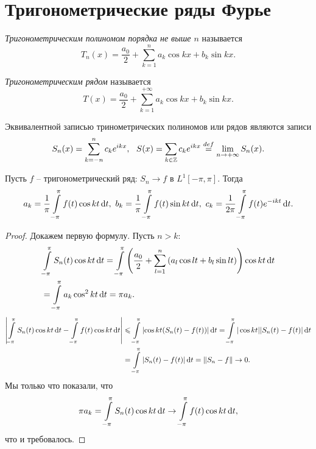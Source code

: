 \section{Тригонометрические ряды Фурье}

\begin{definition}
    \textit{Тригонометрическим полиномом порядка не выше $n$} называется
    \[
        T_n(x) = \frac{a_0}{2} + \sum_{k = 1}^n{a_k \cos{kx} + b_k \sin{kx}}
    .\]
\end{definition}

\begin{definition}
    \textit{Тригонометрическим рядом} называется
    \[
        T(x) = \frac{a_0}{2} + \sum_{k = 1}^{+\infty}{a_k \cos{kx} + b_k \sin{kx}}
    .\]
\end{definition}

\begin{remark}
    Эквивалентной записью тринометрических полиномов или рядов являются записи
    \[
        S_n(x) = \sum_{k = -n}^n{c_k e^{ikx}},~~ S(x) = \sum_{k \in \bZ}{c_k e^{ikx}}
        \defeq \lim_{n \to +\infty}{S_n(x)}
    .\]
\end{remark}

\begin{lemma}
    Пусть $f$ -- тригонометрический ряд: $S_n \to f$ в $L^1[-\pi, \pi]$. Тогда
    \[
        a_k = \frac{1}{\pi}\intl_{-\pi}^\pi{f(t) \cos{kt} \dd t},~
        b_k = \frac{1}{\pi}\intl_{-\pi}^\pi{f(t) \sin{kt} \dd t},~
        c_k = \frac{1}{2\pi}\intl_{-\pi}^\pi{f(t) e^{-ikt} \dd t}
    .\]
\end{lemma}
\begin{proof}
    Докажем первую формулу. Пусть $n > k$:
    \begin{align*}
        &\intl_{-\pi}^\pi{S_n(t) \cos{kt} \dd t} = \intl_{-\pi}^\pi{
            \parens*{\frac{a_0}{2} + \sum_{l = 1}^n{\parens*{a_l \cos{lt} + b_l 
        \sin{lt}}}} \cos{kt} \dd t} \\
        &= \intl_{-\pi}^\pi{a_k \cos^2{kt} \dd t} = \pi a_k
    .\end{align*}
    \begin{align*}
        \abs*{\intl_{-\pi}^\pi{S_n(t) \cos{kt} \dd t} - \intl_{-\pi}^\pi{f(t) \cos{kt} \dd t}}
        &\leqslant \intl_{-\pi}^\pi{\abs*{\cos{kt} (S_n(t) - f(t))} \dd t} =
        \intl_{-\pi}^\pi{|\cos{kt}| |S_n(t) - f(t)| \dd t} \\
        &= \intl_{-\pi}^\pi{|S_n(t) - f(t)| \dd t} = \norm{S_n - f} \to 0
    .\end{align*}
    Мы только что показали, что
    \[
        \pi a_k = \intl_{-\pi}^\pi{S_n(t) \cos{kt} \dd t} \to
        \intl_{-\pi}^\pi{f(t) \cos{kt} \dd t}
    ,\]
    что и требовалось.
\end{proof}

